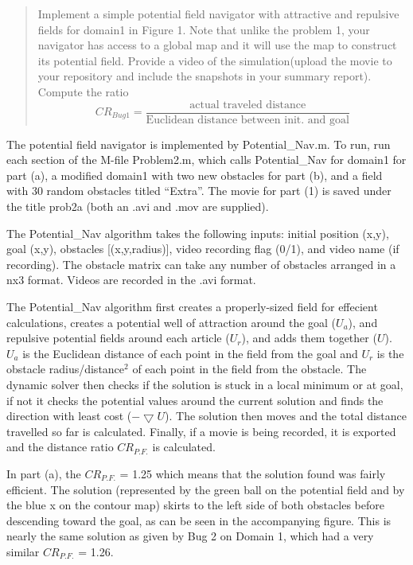 \documentclass{article}
\begin{document}
    \begin{quote}
Implement a simple potential field navigator with attractive and
repulsive fields for domain1 in Figure 1. Note that unlike the problem
1, your navigator has access to a global map and it will use the map to
construct its potential field. Provide a video of the simulation(upload
the movie to your repository and include the snapshots in your summary
report). Compute the ratio
\[{CR}_{Bug1} = \frac{\mbox{actual traveled distance}}{\mbox{Euclidean distance between init. and goal}}\]
\end{quote}

    The potential field navigator is implemented by Potential\_Nav.m. To
run, run each section of the M-file Problem2.m, which calls
Potential\_Nav for domain1 for part (a), a modified domain1 with two new
obstacles for part (b), and a field with 30 random obstacles titled
``Extra''. The movie for part (1) is saved under the title prob2a (both
an .avi and .mov are supplied).

The Potential\_Nav algorithm takes the following inputs: initial
position (x,y), goal (x,y), obstacles {[}(x,y,radius){]}, video
recording flag (0/1), and video name (if recording). The obstacle matrix
can take any number of obstacles arranged in a nx3 format. Videos are
recorded in the .avi format.

The Potential\_Nav algorithm first creates a properly-sized field for
effecient calculations, creates a potential well of attraction around
the goal ($U_a$), and repulsive potential fields around each article
($U_r$), and adds them together ($U$). $U_a$ is the Euclidean distance
of each point in the field from the goal and $U_r$ is the obstacle
radius/distance$^2$ of each point in the field from the obstacle. The
dynamic solver then checks if the solution is stuck in a local minimum
or at goal, if not it checks the potential values around the current
solution and finds the direction with least cost
($-\bigtriangledown{U}$). The solution then moves and the total distance
travelled so far is calculated. Finally, if a movie is being recorded,
it is exported and the distance ratio $CR_{P.F.}$ is calculated.

In part (a), the $CR_{P.F.}$ = 1.25 which means that the solution found
was fairly efficient. The solution (represented by the green ball on the
potential field and by the blue x on the contour map) skirts to the left
side of both obstacles before descending toward the goal, as can be seen
in the accompanying figure. This is nearly the same solution as given by
Bug 2 on Domain 1, which had a very similar $CR_{P.F.}$ = 1.26.
\end{document}
